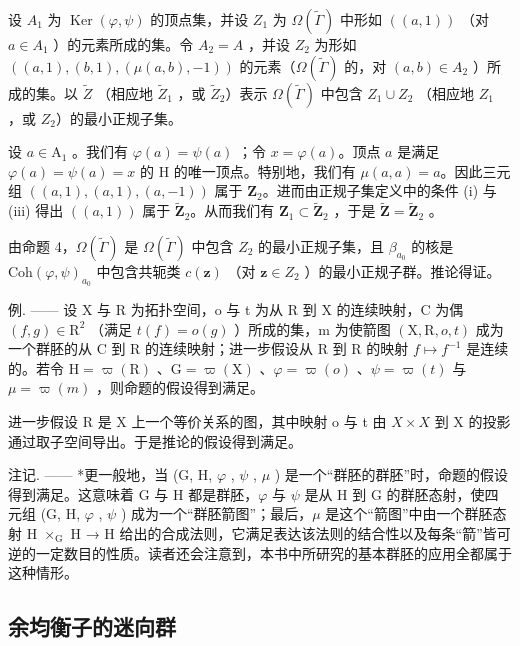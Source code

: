 设 \(A_{1}\) 为 \(\operatorname{Ker}(\varphi,\psi)\) 的顶点集，并设 \(Z_{1}\) 为 \(\Omega(\widetilde{\Gamma})\) 中形如 \(((a,1))\) （对 \(a\in A_{1}\) ）的元素所成的集。令 \(A_{2}=A\) ，并设 \(Z_{2}\) 为形如 \(((a,1),(b,1),(\mu(a,b),-1))\) 的元素（\(\Omega(\widetilde{\Gamma})\) 的，对 \((a,b)\in A_{2}\) ）所成的集。以 \(\widetilde{Z}\) （相应地 \(\widetilde{Z}_{1}\) ，或 \(\widetilde{Z}_{2}\)）表示 \(\Omega(\widetilde{\Gamma})\) 中包含 \(Z_{1}\cup Z_{2}\) （相应地 \(Z_{1}\) ，或 \(Z_{2}\)）的最小正规子集。

设 \(a \in \mathrm{A}_1\) 。我们有 \(\varphi(a) = \psi(a)\) ；令 \(x = \varphi(a)\)。顶点 \(a\) 是满足 \(\varphi(a) = \psi(a) = x\) 的 H 的唯一顶点。特别地，我们有 \(\mu(a, a) = a\)。因此三元组 \(((a, 1), (a, 1), (a, -1))\) 属于 \(\mathbf{Z}_2\)。进而由正规子集定义中的条件 (i) 与 (iii) 得出 \(((a, 1))\) 属于 \(\widetilde{\mathbf{Z}}_2\)。从而我们有 \(\mathbf{Z}_1 \subset \widetilde{\mathbf{Z}}_2\) ，于是 \(\widetilde{\mathbf{Z}} = \widetilde{\mathbf{Z}}_2\) 。

由命题 4，\(\Omega(\tilde{\Gamma})\) 是 \(\Omega(\tilde{\Gamma})\) 中包含 \(Z_{2}\) 的最小正规子集，且 \(\beta_{a_{0}}\) 的核是 \(\mathrm{Coh}(\varphi,\psi)_{a_{0}}\) 中包含共轭类 \(c(\mathbf{z})\) （对 \(\mathbf{z}\in Z_{2}\) ）的最小正规子群。推论得证。

例. —— 设 X 与 R 为拓扑空间，o 与 t 为从 R 到 X 的连续映射，C 为偶 \((f,g)\in\mathrm{R}^{2}\) （满足 \(t(f)=o(g)\) ）所成的集，m 为使箭图 \((\mathrm{X},\mathrm{R},o,t)\) 成为一个群胚的从 C 到 R 的连续映射；进一步假设从 R 到 R 的映射 \(f\mapsto f^{-1}\) 是连续的。若令 \(\mathrm{H}=\varpi(\mathrm{R})\) 、\(\mathrm{G}=\varpi(\mathrm{X})\) 、\(\varphi=\varpi(o)\) 、\(\psi=\varpi(t)\) 与 \(\mu=\varpi(m)\) ，则命题的假设得到满足。

进一步假设 R 是 X 上一个等价关系的图，其中映射 o 与 t 由 \(X \times X\) 到 X 的投影通过取子空间导出。于是推论的假设得到满足。

注记. —— *更一般地，当 (G, H, \(\varphi\) , \(\psi\) , \(\mu\) ) 是一个“群胚的群胚”时，命题的假设得到满足。这意味着 G 与 H 都是群胚，\(\varphi\) 与 \(\psi\) 是从 H 到 G 的群胚态射，使四元组 (G, H, \(\varphi\) , \(\psi\) ) 成为一个“群胚箭图”；最后，\(\mu\) 是这个“箭图”中由一个群胚态射 H \(\times_{\mathrm{G}}\) H → H 给出的合成法则，它满足表达该法则的结合性以及每条“箭”皆可逆的一定数目的性质。读者还会注意到，本书中所研究的基本群胚的应用全都属于这种情形。

\subsection{余均衡子的迷向群}

